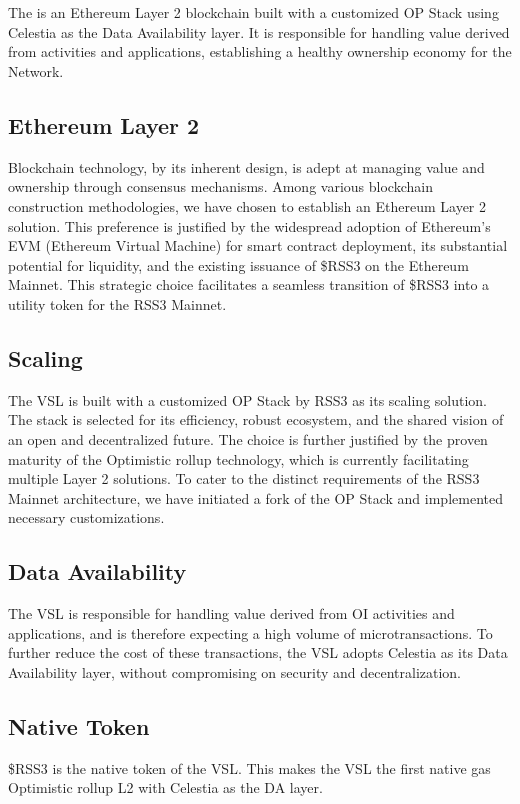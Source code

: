 \section{}
\label{sec:VSL}

The  is an Ethereum Layer 2 blockchain built with a customized OP Stack using Celestia as the Data Availability layer.
It is responsible for handling value derived from  activities and applications, establishing a healthy ownership economy for the Network.

\subsection{Ethereum Layer 2}

Blockchain technology, by its inherent design, is adept at managing value and ownership through consensus mechanisms.
Among various blockchain construction methodologies, we have chosen to establish an Ethereum Layer 2 solution.
This preference is justified by the widespread adoption of Ethereum's EVM (Ethereum Virtual Machine) for smart contract deployment, its substantial potential for liquidity, and the existing issuance of \$RSS3 on the Ethereum Mainnet. 
This strategic choice facilitates a seamless transition of \$RSS3 into a utility token for the RSS3 Mainnet.

\subsection{Scaling}
The \gls{VSL} is built with a customized OP Stack by RSS3 as its scaling solution.
The stack is selected for its efficiency, robust ecosystem, and the shared vision of an open and decentralized future.
The choice is further justified by the proven maturity of the Optimistic rollup technology, which is currently facilitating multiple Layer 2 solutions.
To cater to the distinct requirements of the RSS3 Mainnet architecture, we have initiated a fork of the OP Stack and implemented necessary customizations.

\subsection{Data Availability}

The \gls{VSL} is responsible for handling value derived from \gls{OI} activities and applications, and is therefore expecting a high volume of microtransactions.
To further reduce the cost of these transactions, the \gls{VSL} adopts Celestia as its Data Availability layer, without compromising on security and decentralization.

\subsection{Native Token}

\$RSS3 is the native token of the \gls{VSL}.
This makes the \gls{VSL} the first native gas Optimistic rollup L2 with Celestia as the DA layer.